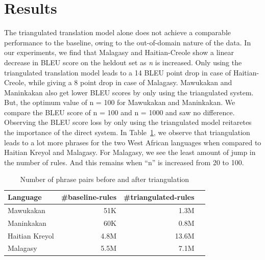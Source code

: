 \section{Results}
\label{sec:results}
 The triangulated translation model alone does not achieve a comparable performance to the baseline, owing to the out-of-domain nature of the data. In our experiments, we find that Malagasy and Haitian-Creole show a linear decrease in BLEU score on the heldout set as \emph{n} is increased. Only using the triangulated translation model leads to a 14 BLEU point drop in case of Haitian-Creole, while giving a 8 point drop in case of Malagasy. Mawukakan and Maninkakan also get lower BLEU scores by only using the triangulated system. But, the optimum value of n = 100 for Mawukakan and Maninkakan. We compare the BLEU score of n = 100 and n = 1000 and saw no difference. Observing the BLEU score loss by only using the triangulated model reitaretes the importance of the direct system.  In Table~\ref{table:mul_rules}, we observe that triangulation leads to a lot more phrases for the two West African languages when compared to Haitian Kreyol and Malagasy. For Malagasy, we see the least amount of jump in the number of rules. And this remains when ``n'' is increased from 20 to 100. %

 \begin{table}
	\small
	\centering
	\begin{tabular}{lrrr}
	\toprule
	Language & \#baseline-rules & \#triangulated-rules \\
	\toprule
	Mawukakan & 51K & 1.3M \\
	Maninkakan & 60K & 0.8M \\
	Haitian Kreyol & 4.8M & 13.6M \\
	Malagasy & 5.5M & 7.1M \\
	\bottomrule
	\end{tabular}
	\caption{Number of phrase pairs before and after triangulation}
	\label{table:mul_rules}
\end{table}


